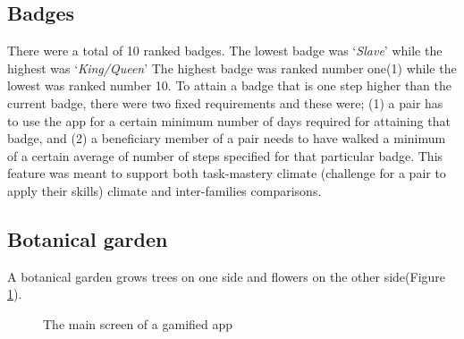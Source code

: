 \documentclass{sig-alternate}
\begin{document}
\subsection*{\textbf{Badges}}
There were a total of 10 ranked badges. The lowest badge was `\emph{Slave}' while the highest was `\emph{King/Queen}' The highest badge was ranked number one(1) while the lowest was ranked number 10. To attain a badge that is one step higher than the current badge, there were two fixed requirements and these were; (1) a pair has to use the app for a certain minimum number of days required for attaining that badge, and (2) a beneficiary member of a pair needs to have walked a minimum of a certain average of number of steps specified for that particular badge. This feature was meant to support both task-mastery climate (challenge for a pair to apply their skills) climate and inter-families comparisons.
\subsection*{\textbf{Botanical garden}}
A botanical garden grows trees on one side and flowers on the other side(Figure \ref{figure:botanical}).
\begin{figure}[H]
\centering
{}
\caption{The main screen of a gamified app}
\label{figure:botanical}
\end{figure}
\end{document}
